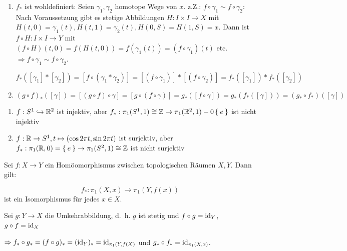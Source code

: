 \begin{beweis}\leavevmode
    \begin{enumerate}[label=\alph*)]
        \item $f_*$ ist wohldefiniert: Seien $\gamma_1, \gamma_2$ homotope
              Wege von $x$. z.Z.: $f \circ \gamma_1 \sim f \circ \gamma_2$:
              Nach Voraussetzung gibt es stetige Abbildungen $H:I\times I \rightarrow X$
              mit $H(t,0) = \gamma_1(t), H(t,1) = \gamma_2(t), H(0,S) = H(1, S) = x$.
              Dann ist $f \circ H: I \times I \rightarrow Y$ mit
               $(f \circ H)(t,0) = f(H(t,0)) = f(\gamma_1(t)) = (f \circ \gamma_1)(t)$
              etc. $\Rightarrow f \circ \gamma_1 \sim f \circ \gamma_2$.

              $f_*([\gamma_1] * [\gamma_2]) = [f \circ (\gamma_1 * \gamma_2)] = [(f \circ \gamma_1)] * [(f \circ \gamma_2)] = f_*([\gamma_1]) * f_*([\gamma_2])$
        \item $(g \circ f)_* ([\gamma]) = [(g \circ f) \circ \gamma] = [g \circ (f \circ \gamma)] = g_* ([f \circ \gamma]) = g_* (f_* ([\gamma])) = (g_* \circ f_*)([\gamma])$
    \end{enumerate}
\end{beweis}

\begin{beispiel}
    \begin{enumerate}[label=\arabic*)]
        \item $f:S^1 \hookrightarrow \mathbb{R}^2$ ist injektiv, aber 
              $f_*:\pi_1(S^1, 1) \cong \mathbb{Z} \rightarrow \pi_1(\mathbb{R}^2, 1) -0 \Set{e}$
              ist nicht injektiv
        \item $f: \mathbb{R} \rightarrow S^1, t \mapsto (\cos 2 \pi t, \sin 2 \pi t)$
              ist surjektiv, aber $f_*: \pi_1(\mathbb{R}, 0) = \Set{e} \rightarrow \pi_1(S^2, 1) \cong \mathbb{Z}$
              ist nicht surjektiv
    \end{enumerate}
\end{beispiel}

\begin{korollar}%
    Sei $f:X \rightarrow Y$ ein Homöomorphismus zwischen topologischen
    Räumen $X, Y$. Dann gilt:

    \[f_*: \pi_1(X,x) \rightarrow \pi_1(Y, f(x))\]
    ist ein Isomorphismus für jedes $x \in X$.
\end{korollar}

\begin{beweis}
    Sei $g: Y \rightarrow X$ die Umkehrabbildung, d.~h. $g$ ist stetig
    und $f \circ g = \textnormal{id}_Y$, $g \circ f = \textnormal{id}_X$

    $\Rightarrow f_* \circ g_* = (f \circ g)_* = (\textnormal{id}_Y)_* = \textnormal{id}_{\pi_1 (Y, f(X)}$
    und $g_* \circ f_* = \textnormal{id}_{\pi_1(X,x)}$.
\end{beweis}

